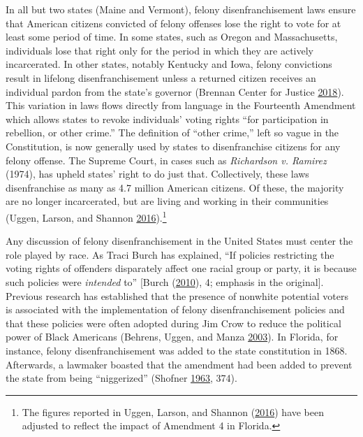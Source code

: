 \documentclass[]{article}
\let\rmarkdownfootnote\footnote%
\def\footnote{\protect\rmarkdownfootnote}
\begin{document}
In all but two states (Maine and Vermont), felony disenfranchisement laws ensure that American citizens convicted of felony offenses lose the right to vote for at least some period of time. In some states, such as Oregon and Massachusetts, individuals lose that right only for the period in which they are actively incarcerated. In other states, notably Kentucky and Iowa, felony convictions result in lifelong disenfranchisement unless a returned citizen receives an individual pardon from the state's governor (Brennan Center for Justice \protect\hyperlink{ref-bcj_laws}{2018}). This variation in laws flows directly from language in the Fourteenth Amendment which allows states to revoke individuals' voting rights ``for participation in rebellion, or other crime.'' The definition of ``other crime,'' left so vague in the Constitution, is now generally used by states to disenfranchise citizens for any felony offense. The Supreme Court, in cases such as \emph{Richardson v. Ramirez} (1974), has upheld states' right to do just that. Collectively, these laws disenfranchise as many as 4.7 million American citizens. Of these, the majority are no longer incarcerated, but are living and working in their communities (Uggen, Larson, and Shannon \protect\hyperlink{ref-sentencing_2016}{2016}).\footnote{The figures reported in Uggen, Larson, and Shannon (\protect\hyperlink{ref-sentencing_2016}{2016}) have been adjusted to reflect the impact of Amendment 4 in Florida.}

Any discussion of felony disenfranchisement in the United States must center the role played by race. As Traci Burch has explained, ``If policies restricting the voting rights of offenders disparately affect one racial group or party, it is because such policies were \emph{intended} to'' {[}Burch (\protect\hyperlink{ref-Burch2010}{2010}), 4; emphasis in the original{]}. Previous research has established that the presence of nonwhite potential voters is associated with the implementation of felony disenfranchisement policies and that these policies were often adopted during Jim Crow to reduce the political power of Black Americans (Behrens, Uggen, and Manza \protect\hyperlink{ref-Behrens2003}{2003}). In Florida, for instance, felony disenfranchisement was added to the state constitution in 1868. Afterwards, a lawmaker boasted that the amendment had been added to prevent the state from being ``niggerized'' (Shofner \protect\hyperlink{ref-florida_1868}{1963}, 374).
\end{document}
